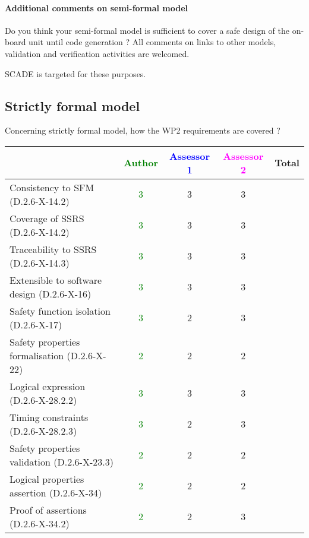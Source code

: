 \paragraph{Additional comments on semi-formal  model} Do you think your semi-formal  model is sufficient to cover a safe design of the on-board unit until code generation ?
All comments on links to  other models, validation and verification activities are welcomed.

\begin{author_comment}
SCADE is targeted for these purposes.   
\end{author_comment}


\subsection{Strictly formal model}

Concerning strictly formal model, how the WP2 requirements are covered ?

\begin{tabular}{|l | c | c | c | c|}
\hline
& \textcolor{green}{Author} & \textcolor{blue}{Assessor 1} & \textcolor{magenta}{Assessor 2} & Total \\
\hline 
Consistency to SFM (D.2.6-X-14.2) & \textcolor{green}{3} & 3 &3 &  \\
\hline
Coverage of SSRS (D.2.6-X-14.2)  &\textcolor{green}{3} & 3 &3 &  \\
\hline
Traceability to  SSRS (D.2.6-X-14.3)  &\textcolor{green}{3} & 3 &3 &  \\
\hline
Extensible to software design (D.2.6-X-16)  &\textcolor{green}{3} & 3 &3 &  \\
\hline
Safety function isolation (D.2.6-X-17)  &  \textcolor{green}{3}& 2 &3 &  \\
\hline 
Safety properties formalisation (D.2.6-X-22)  &  \textcolor{green}{2}&
2&2 &  \\
\hline
Logical expression (D.2.6-X-28.2.2)  &  \textcolor{green}{3}&3 &3 &  \\
\hline
Timing constraints (D.2.6-X-28.2.3)  &  \textcolor{green}{3}&2 &3 &  \\
\hline
Safety properties validation (D.2.6-X-23.3)  &  \textcolor{green}{2}& 2 &2 &  \\
\hline
Logical properties assertion (D.2.6-X-34)  &  \textcolor{green}{2}& 2 &2 &  \\
\hline
Proof of assertions (D.2.6-X-34.2)  &  \textcolor{green}{2} & 2 &3 &  \\
\hline
\end{tabular}


